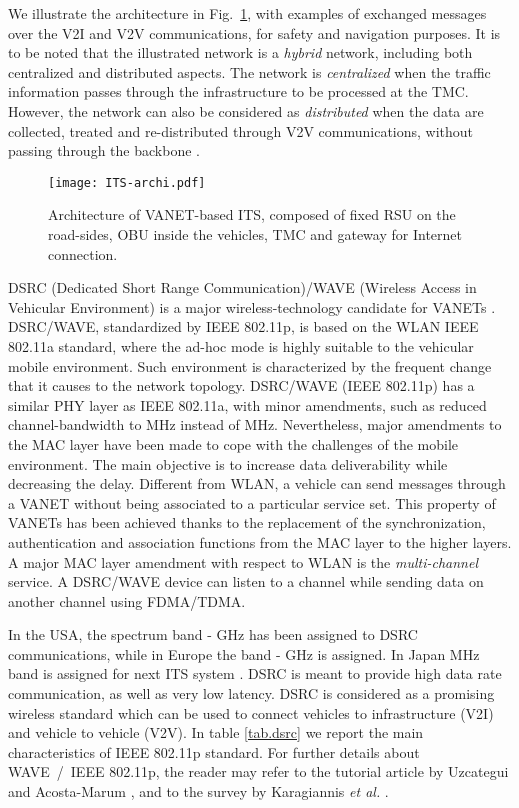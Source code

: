 \documentclass[10pt,onecolumn]{article}
\begin{document}
We illustrate the architecture in Fig.~\ref{fig:vanet1}, with examples of exchanged messages over the V2I and V2V communications, for safety and navigation purposes. 
It is to be noted that the illustrated network is a \textit{hybrid} network, including both centralized and distributed aspects. 
The network is \textit{centralized} when the traffic information passes through the infrastructure to be processed at the TMC. 
However, the network can also be considered as \textit{distributed} when the data are collected, treated and re-distributed through V2V communications, without passing through the backbone \cite{Jerbi2007, Panichpapiboon2008, Garelli2011}.

\begin{figure}[ht] 
\centering
\texttt{[image: ITS-archi.pdf]}
\caption{Architecture of VANET-based ITS, composed of fixed RSU on the road-sides, OBU inside the vehicles, TMC and gateway for Internet connection.}
\label{fig:vanet1}
\end{figure} 

DSRC (Dedicated Short Range Communication)/WAVE (Wireless Access in Vehicular Environment) is a major wireless-technology candidate for VANETs \cite{NotesDSRC10}.
DSRC/WAVE, standardized by IEEE 802.11p, is based on the WLAN IEEE 802.11a standard, where the ad-hoc mode is highly suitable to the vehicular mobile environment. Such environment is characterized by the frequent change that it causes to the network topology. 
DSRC/WAVE (IEEE 802.11p) has a similar PHY layer as IEEE 802.11a, with minor amendments, such as reduced channel-bandwidth to MHz instead of MHz. Nevertheless, major amendments to the MAC layer have been made to cope with the challenges of the mobile environment. 
The main objective is to increase data deliverability while decreasing the delay. Different from WLAN, a vehicle can send messages through a VANET without being associated to a particular service set. This property of VANETs has been achieved thanks to the replacement of the synchronization, authentication and association functions from the MAC layer to the higher layers.
A major MAC layer amendment with respect to WLAN is the \textit{multi-channel} service. A DSRC/WAVE device can listen to a channel while sending data on another channel using FDMA/TDMA.

In the USA, the spectrum band  -  GHz has been assigned to DSRC communications, while in Europe the band  -  GHz is assigned. In Japan MHz band is assigned for next ITS system \cite{wave}. DSRC is meant to provide high data rate communication, as well as very low latency. DSRC is considered as a promising wireless standard which can be used to connect vehicles to infrastructure (V2I) and vehicle to vehicle (V2V). 
In table \ref{tab.dsrc} we report the main characteristics of IEEE 802.11p standard.
For further details about WAVE~/~IEEE 802.11p, the reader may refer to the tutorial article by Uzcategui and Acosta-Marum \cite{uzcategui2009wave}, and to the survey by Karagiannis \textit{et al.} \cite{karagiannis2011vehicular}.
\end{document}
